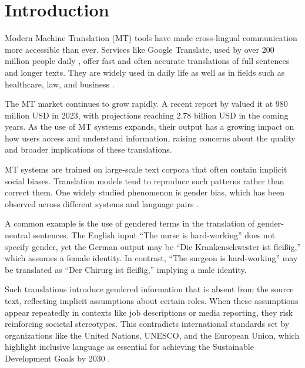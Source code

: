 \chapter{Introduction}
    Modern Machine Translation (MT) tools have made cross-lingual communication more accessible than ever. Services like Google Translate, used by over 200 million people daily \parencite{pratesAssessingGenderBias2019,shresthaExploringGenderBiases2022}, offer fast and often accurate translations of full sentences and longer texts. They are widely used in daily life as well as in fields such as healthcare, law, and business \parencite{kapplAreAllSpanish2025}.

    The MT market continues to grow rapidly. A recent report by \textcite{skyquestMachineTranslationMT2025} valued it at 980 million USD in 2023, with projections reaching 2.78 billion USD in the coming years. As the use of MT systems expands, their output has a growing impact on how users access and understand information, raising concerns about the quality and broader implications of these translations.
    
    MT systems are trained on large-scale text corpora that often contain implicit social biases. Translation models tend to reproduce such patterns rather than correct them. One widely studied phenomenon is gender bias, which has been observed across different systems and language pairs \parencite{choMeasuringGenderBias2019,soundararajanInvestigatingGenderBias2024,smacchiaDoesAIReflect2024}. 

    A common example is the use of gendered terms in the translation of gender-neutral sentences. The English input “The nurse is hard-working” does not specify gender, yet the German output may be “Die Krankenschwester ist fleißig,” which assumes a female identity. In contrast, “The surgeon is hard-working” may be translated as “Der Chirurg ist fleißig,” implying a male identity. 
    
    Such translations introduce gendered information that is absent from the source text, reflecting implicit assumptions about certain roles. When these assumptions appear repeatedly in contexts like job descriptions or media reporting, they risk reinforcing societal stereotypes. This contradicts international standards set by organizations like the United Nations, UNESCO, and the European Union, which highlight inclusive language as essential for achieving the Sustainable Development Goals by 2030 \parencite{sczesnyCanGenderFairLanguage2016,unitednationsAchieveGenderEquality2023}.

